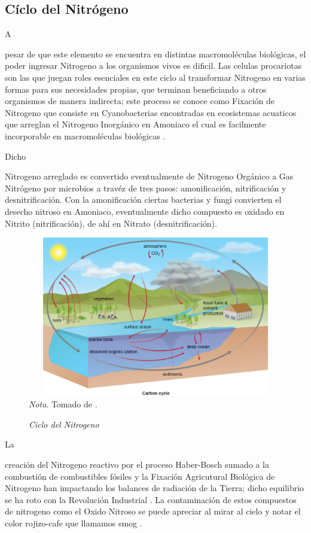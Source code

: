 \documentclass[stu, 12pt, letterpaper, donotrepeattitle, floatsintext, natbib]{apa7}
\begin{document}
\subsection{Cíclo del Nitrógeno}
A \begin{justifying}
    pesar de que este elemento se encuentra en distintas macromoléculas biológicas, el poder ingresar Nitrogeno a los organismos vivos es dificil. Las celulas procariotas son las que juegan roles esenciales en este ciclo
    al transformar Nitrogeno en varias formas para sus necesidades propias, que terminan beneficiando a otros organismos de manera indirecta; este proceso se conoce como Fixación de Nitrogeno que consiste en Cyanobacterias
    encontradas en ecosistemas acuaticos que arreglan el Nitrogeno Inorgánico en Amoniaco el cual es facilmente incorporable en macromoléculas biológicas \citep{unknown-author-no-date}.\par
\end{justifying}
Dicho \begin{justifying}
    Nitrogeno arreglado es convertido eventualmente de Nitrogeno Orgánico a Gas Nitrógeno por microbios a travéz de tres pasos: amonificación, nitrificación y desnitrificación. Con la amonificación ciertas bacterias y fungi 
    convierten el desecho nitroso en Amoniaco, eventualmente dicho compuesto es oxidado en Nitrito (nitrificación), de ahí en Nitrato (desnitrificación).\par
\end{justifying}
\vspace{\baselineskip}
\begin{figure}[H]
    \caption{\emph{Ciclo del Nitrogeno}}
    \centering
    \includegraphics[width=14cm,height=7cm]{nitrogeno.jpg}
    \bigskip
    \\\small\textit{Nota}. Tomado de \cite{openstax-no-date}. %
\end{figure}
La \begin{justifying}
    creación del Nitrogeno reactivo por el proceso Haber-Bosch sumado a la combustión de combustibles fósiles y la Fixación Agricutural Biológica de Nitrogeno han impactando los balances de radiación de la Tierra; dicho equilibrio
    se ha roto con la Revolución Industrial \citep{stocker-2013}. %
    La contaminación de estos compuestos de nitrogeno como el Oxido Nitroso se puede apreciar al mirar al cielo y notar el color rojizo-cafe que llamamos smog \cite{unknown-author-no-date}.\par %
\end{justifying}
\vspace{\baselineskip}
\end{document}
